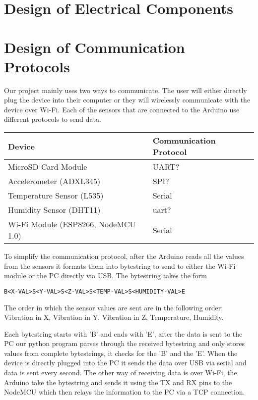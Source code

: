 \documentclass[12pt, titlepage]{article}
\begin{document}
\section{Design of Electrical Components}



\newpage
\section{Design of Communication Protocols}
Our project mainly uses two ways to communicate. The user will either directly plug the device into their computer or they will wirelessly communicate with the device over Wi-Fi. Each of the sensors that are connected to the Arduino use different protocols to send data.

\begin{tabular}{| p{} | p{}|}
  \hline
  \rowcolor[gray]{0.9}
  Device & Communication Protocol \\
  \hline
  MicroSD Card Module & UART?\\
  \hline
  Accelerometer (ADXL345) &  SPI?\\
  \hline
  Temperature Sensor (L535) & Serial \\
  \hline
  Humidity Sensor (DHT11) & uart? \\
  \hline
  Wi-Fi Module (ESP8266, NodeMCU 1.0) & Serial \\
  \hline
\end{tabular}



To simplify the communication protocol, after the Arduino reads all the values from the sensors it formats them into bytestring to send to either the Wi-Fi module or the PC directly via USB. The bytestring takes the form

\begin{verbatim}
B<X-VAL>S<Y-VAL>S<Z-VAL>S<TEMP-VAL>S<HUMIDITY-VAL>E
\end{verbatim}

The order in which the sensor values are sent are in the following order; Vibration in X, Vibration in Y, Vibration in Z, Temperature, Humidity.

Each bytestring starts with 'B' and ends with 'E', after the data is sent to the PC our python program parses through the received bytestring and only stores values from complete bytestrings, it checks for the 'B' and the 'E'. When the device is directly plugged into the PC it sends the data over USB via serial and data is sent every second. The other way of receiving data is over Wi-Fi, the Arduino take the bytestring and sends it using the TX and RX pins to the NodeMCU which then relays the information to the PC via a TCP connection.
\end{document}
